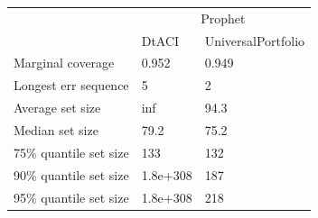 \begin{tabular}{lll}
\toprule
& \multicolumn{2}{c}{Prophet} \\
& DtACI & UniversalPortfolio \\
\midrule
Marginal coverage & 0.952 & 0.949 \\
Longest err sequence & 5 & 2 \\
Average set size & inf & 94.3 \\
Median set size & 79.2 & 75.2 \\
75\% quantile set size & 133 & 132 \\
90\% quantile set size & 1.8e+308 & 187 \\
95\% quantile set size & 1.8e+308 & 218 \\
\bottomrule
\end{tabular}
